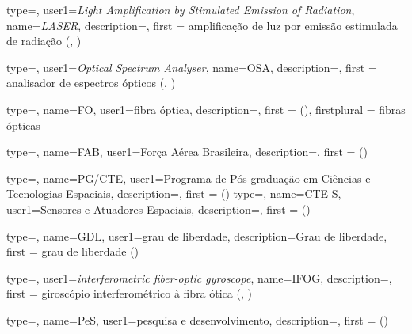 {type=\acronymtype,
  user1={\emph{Light Amplification by Stimulated Emission of Radiation}},
  name={\emph{LASER}},
  description={},
  first = {amplificação de luz por emissão estimulada de radiação (, )}
}

{type=\acronymtype,
  user1={\emph{Optical Spectrum Analyser}},
  name={OSA},
  description={},
  first = {analisador de espectros ópticos (, )}
}

{type=\acronymtype,
  name={FO},
  user1={fibra óptica},
  description={},
  first = { ()},
  firstplural = {fibras ópticas}
}


{type=\acronymtype,
  name={FAB},
  user1={Força Aérea Brasileira},
  description={},
  first = { ()}
}

{type=\acronymtype,
  name={PG/CTE},
  user1={Programa de Pós-graduação em Ciências e Tecnologias Espaciais},
  description={},
  first = { ()}
}
{type=\acronymtype,
  name={CTE-S},
  user1={Sensores e Atuadores Espaciais},
  description={},
  first = { ()}
}

{type=\acronymtype,
  name={GDL},
  user1={grau de liberdade},
  description={Grau de liberdade},
  first = {grau de liberdade ()}
}

{type=\acronymtype,
  user1=\emph{interferometric fiber-optic gyroscope},
  name={IFOG},
  description={},
  first = {giroscópio interferométrico à fibra ótica (, )}
}

{type=\acronymtype,
  name={PeS},
  user1={pesquisa e desenvolvimento},
  description={},
  first = { ()}
}
